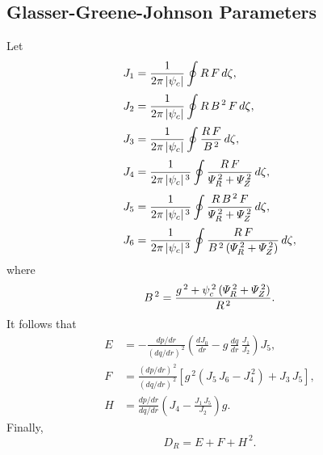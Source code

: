 \documentclass[notitlepage,12pt]{article}
\begin{document}
\subsection{Glasser-Greene-Johnson Parameters}
Let
\begin{align}
J_1 &= \frac{1}{2\pi\,|\psi_c|}\oint R\,F\,d\zeta,\\[0.5ex]
J_2 &= \frac{1}{2\pi\,|\psi_c|}\oint R\,B^{\,2}\,F\,d\zeta,\\[0.5ex]
J_3 &= \frac{1}{2\pi\,|\psi_c|}\oint \frac{R\,F}{B^{\,2}}\,d\zeta,\\[0.5ex]
J_4 &= \frac{1}{2\pi\,|\psi_c|^{\,3}}\oint \frac{R\,F}{{\mit\Psi}_R^{\,2}+{\mit\Psi}_Z^{\,2}}\,d\zeta,\\[0.5ex]
J_5 &= \frac{1}{2\pi\,|\psi_c|^{\,3}}\oint \frac{R\,B^{\,2}\,F}{{\mit\Psi}_R^{\,2}+{\mit\Psi}_Z^{\,2}}\,d\zeta,\\[0.5ex]
J_6 &= \frac{1}{2\pi\,|\psi_c|^{\,3}}\oint \frac{R\,F}{B^{\,2}\,({\mit\Psi}_R^{\,2}+{\mit\Psi}_Z^{\,2})}\,d\zeta,
\end{align}
where 
\begin{equation}
B^{\,2} = \frac{g^{\,2} + \psi_c^{\,2}\,({\mit\Psi}_R^{\,2}+{\mit\Psi}_Z^{\,2})}{R^{\,2}}.
\end{equation}
It follows that
\begin{align}
E &= - \frac{dp/dr}{(dq/dr)^{\,2}}\left(\frac{dJ_0}{dr} - g\,\frac{dq}{dr}\,\frac{J_1}{J_2}\right)J_5,\\[0.5ex]
F&= \frac{(dp/dr)^{\,2}}{(dq/dr)^{\,2}}\left[g^{\,2}\left(J_5\,J_6-J_4^{\,2}\right)+ J_3\,J_5\right],\\[0.5ex]
H&= \frac{dp/dr}{dq/dr}\left(J_4- \frac{J_1\,J_5}{J_2}\right)g.
\end{align}
Finally,
\begin{equation}
D_R = E+ F+ H^{\,2}.
\end{equation}
\end{document}
